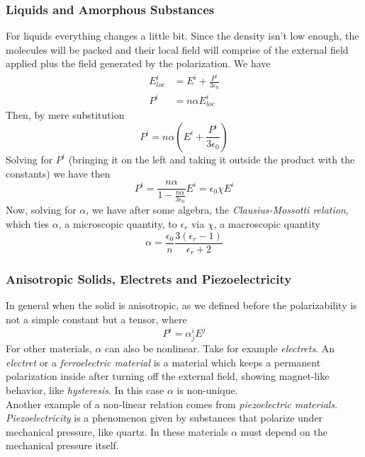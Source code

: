 \documentclass[../electromagnetism]{subfiles}
\begin{document}
\subsubsection{Liquids and Amorphous Substances}
For liquids everything changes a little bit. Since the density isn't low enough, the molecules will be packed and their local field will comprise of the external field applied plus the field generated by the polarization. We have
\begin{equation*}
	\begin{aligned}
		E_{loc}^i&=E^i+\frac{P^i}{3\epsilon_0}\\
		P^i&=n\alpha E^i_{loc}
	\end{aligned}
\end{equation*}
Then, by mere substitution
\begin{equation*}
	P^i=n\alpha\left( E^i+\frac{P^i}{3\epsilon_0} \right)
\end{equation*}
Solving for $P^i$ (bringing it on the left and taking it outside the product with the constants) we have then
\begin{equation}
	P^i=\frac{n\alpha}{1-\frac{n\alpha}{3\epsilon_0}} E^i=\epsilon_0\chi E^i
	\label{eq:polliq}
\end{equation}
Now, solving for $\alpha$, we have after some algebra, the \textit{Clausius-Mossotti relation}, which ties $\alpha$, a microscopic quantity, to $\epsilon_r$ via $\chi$, a macroscopic quantity
\begin{equation}
	\alpha=\frac{\epsilon_0}{n}\frac{3(\epsilon_r-1)}{\epsilon_r+2}
	\label{eq:clausiusmossotti}
\end{equation}
\subsubsection{Anisotropic Solids, Electrets and Piezoelectricity}
In general when the solid is anisotropic, as we defined before the polarizability is not a simple constant but a tensor, where
\begin{equation}
	P^i=\alpha^i_jE^j
	\label{eq:anisosolidspol}
\end{equation}
For other materials, $\alpha$ can also be nonlinear. Take for example \textit{electrets}. An \textit{electret} or a \textit{ferroelectric material} is a material which keeps a permanent polarization inside after turning off the external field, showing magnet-like behavior, like \textit{hysteresis}. In this case $\alpha$ is non-unique.\\
Another example of a non-linear relation comes from \textit{piezoelectric materials}. \textit{Piezoelectricity} is a phenomenon given by substances that polarize under mechanical pressure, like quartz. In these materials $\alpha$ must depend on the mechanical pressure itself.
\end{document}
